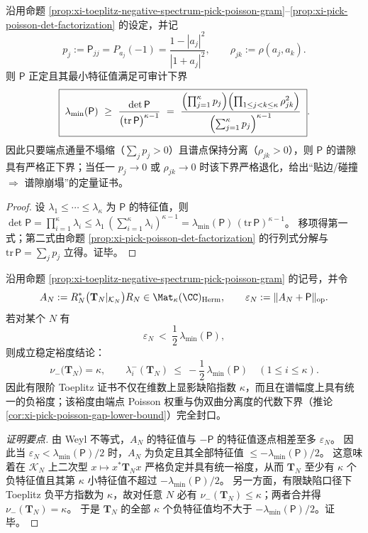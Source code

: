 \begin{corollary}\label{cor:xi-pick-poisson-gap-lower-bound}
沿用命题 \ref{prop:xi-toeplitz-negative-spectrum-pick-poisson-gram}--\ref{prop:xi-pick-poisson-det-factorization} 的设定，并记
\[
p_j:=\mathsf P_{jj}=P_{a_j}(-1)=\frac{1-|a_j|^2}{|1+a_j|^2},
\qquad
\rho_{jk}:=\rho(a_j,a_k).
\]
则 \(\mathsf P\) 正定且其最小特征值满足可审计下界
\[
\boxed{\;
\lambda_{\min}(\mathsf P)\ \ge\ \frac{\det\mathsf P}{\bigl(\mathrm{tr}\,\mathsf P\bigr)^{\kappa-1}}
\ =\
\frac{\Bigl(\prod_{j=1}^{\kappa}p_j\Bigr)\Bigl(\prod_{1\le j<k\le\kappa}\rho_{jk}^2\Bigr)}
{\Bigl(\sum_{j=1}^{\kappa}p_j\Bigr)^{\kappa-1}}\; }.
\]
因此只要端点通量不塌缩（\(\sum_j p_j>0\)）且谱点保持分离（\(\rho_{jk}>0\)），则 \(\mathsf P\) 的谱隙具有严格正下界；当任一 \(p_j\to0\) 或 \(\rho_{jk}\to0\) 时该下界严格退化，给出“贴边/碰撞 \(\Rightarrow\) 谱隙崩塌”的定量证书。
\end{corollary}
\begin{proof}
设 \(\lambda_1\le\cdots\le\lambda_\kappa\) 为 \(\mathsf P\) 的特征值，则
\(
\det\mathsf P=\prod_{i=1}^{\kappa}\lambda_i
\le \lambda_1\,(\sum_{i=1}^{\kappa}\lambda_i)^{\kappa-1}
=\lambda_{\min}(\mathsf P)\,(\mathrm{tr}\,\mathsf P)^{\kappa-1}
\)。
移项得第一式；第二式由命题 \ref{prop:xi-pick-poisson-det-factorization} 的行列式分解与 \(\mathrm{tr}\,\mathsf P=\sum_j p_j\) 立得。证毕。
\end{proof}

\begin{proposition}\label{prop:xi-toeplitz-negative-spectrum-margin-threshold}
沿用命题 \ref{prop:xi-toeplitz-negative-spectrum-pick-poisson-gram} 的记号，并令
\[
A_N:=R_N^\ast\bigl(\mathbf{T}_N|_{\mathcal K_N}\bigr)R_N\in\Mat_{\kappa}(\CC)_{\mathrm{Herm}},
\qquad
\varepsilon_N:=\|A_N+\mathsf P\|_{\mathrm{op}}.
\]
若对某个 \(N\) 有
\[
\varepsilon_N\ <\ \frac12\,\lambda_{\min}(\mathsf P),
\]
则成立稳定裕度结论：
\[
\boxed{\;
\nu_-\!\bigl(\mathbf{T}_N\bigr)=\kappa,
\qquad
\lambda_i^{-}(\mathbf{T}_N)\ \le\ -\frac12\,\lambda_{\min}(\mathsf P)\quad(1\le i\le \kappa).\;}
\]
因此有限阶 Toeplitz 证书不仅在维数上显影缺陷指数 \(\kappa\)，而且在谱幅度上具有统一的负裕度；该裕度由端点 Poisson 权重与伪双曲分离度的代数下界（推论 \ref{cor:xi-pick-poisson-gap-lower-bound}）完全封口。
\end{proposition}
\begin{proof}[证明要点]
由 Weyl 不等式，\(A_N\) 的特征值与 \(-\mathsf P\) 的特征值逐点相差至多 \(\varepsilon_N\)。
因此当 \(\varepsilon_N<\lambda_{\min}(\mathsf P)/2\) 时，\(A_N\) 为负定且其全部特征值 \(\le-\lambda_{\min}(\mathsf P)/2\)。
这意味着在 \(\mathcal K_N\) 上二次型 \(x\mapsto x^\ast\mathbf{T}_N x\) 严格负定并具有统一裕度，从而 \(\mathbf{T}_N\) 至少有 \(\kappa\) 个负特征值且其第 \(\kappa\) 小特征值不超过 \(-\lambda_{\min}(\mathsf P)/2\)。
另一方面，有限缺陷口径下 Toeplitz 负平方指数为 \(\kappa\)，故对任意 \(N\) 必有 \(\nu_-(\mathbf{T}_N)\le \kappa\)；两者合并得 \(\nu_-(\mathbf{T}_N)=\kappa\)。
于是 \(\mathbf{T}_N\) 的全部 \(\kappa\) 个负特征值均不大于 \(-\lambda_{\min}(\mathsf P)/2\)。证毕。
\end{proof}

